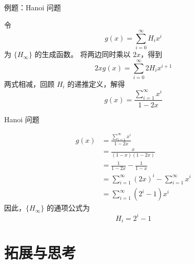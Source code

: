 \documentclass{beamer}
\begin{document}
\begin{frame}{例题：Hanoi 问题}
    \begin{solution}
        令 
        $$
        g(x) = \sum_{i=0}^\infty H_ix^i
        $$ 
        为 $\{H_\infty\}$ 的生成函数。
        \pause
        将两边同时乘以 $2x$，得到
        $$
        2xg(x) = \sum_{i=0}^\infty 2H_ix^{i+1}
        $$
        \pause
        两式相减，回顾 $H_i$ 的递推定义，解得
        $$
            g(x) = \frac{\sum_{i=1}^\infty x^i}{1-2x}
        $$
    \end{solution}
\end{frame}

\begin{frame}{Hanoi 问题}
    \begin{solution}
        \begin{displaymath}
            \begin{aligned}
                g(x) &= \frac{\sum_{i=1}^\infty x^i}{1-2x} \\
                &= \frac{x}{(1-x)(1-2x)}\\
                &= \frac{1}{1-2x} - \frac{1}{1-x}\\
                &= \sum_{i=1}^\infty (2x)^i - \sum_{i=1}^\infty x^i\\
                &= \sum_{i=1}^\infty (2^i - 1)x^i
            \end{aligned}
        \end{displaymath}
        因此，$\{H_\infty\}$ 的通项公式为
        $$
            H_i = 2^i - 1
        $$
    \end{solution}
\end{frame}

\section{拓展与思考}
\end{document}

